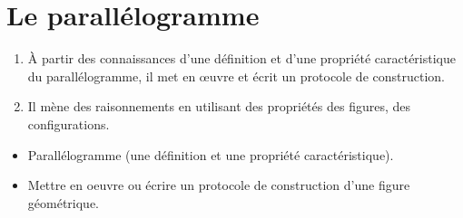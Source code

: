 \themaE
\graphicspath{{../../S21_Le_parallelogramme/Images/}}

\chapter{Le parallélogramme}
\label{S21}


\begin{autoeval}
   \small
   \begin{enumerate}
      \item À partir des connaissances d'une définition et d'une propriété caractéristique du parallélogramme, il met en \oe uvre et écrit un protocole de construction.
      \item Il mène des raisonnements en utilisant des propriétés des figures, des configurations.
   \end{enumerate}
\end{autoeval}

\begin{prerequis}
   \begin{itemize}
      \item Parallélogramme (une définition et une propriété caractéristique).
      \item[\com] Mettre en oeuvre ou écrire un protocole de construction d’une figure géométrique.
   \end{itemize}
\end{prerequis}

\vfill

